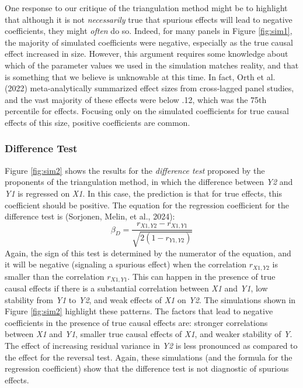 \documentclass[
  man,mask,floatsintext]{apa6}
\begin{document}
One response to our critique of the triangulation method might be to highlight that although it is not \emph{necessarily} true that spurious effects will lead to negative coefficients, they might \emph{often} do so. Indeed, for many panels in Figure \ref{fig:sim1}, the majority of simulated coefficients were negative, especially as the true causal effect increased in size. However, this argument requires some knowledge about which of the parameter values we used in the simulation matches reality, and that is something that we believe is unknowable at this time. In fact, Orth et al. (2022) meta-analytically summarized effect sizes from cross-lagged panel studies, and the vast majority of these effects were below .12, which was the 75th percentile for effects. Focusing only on the simulated coefficients for true causal effects of this size, positive coefficients are common.

\subsubsection{Difference Test}\label{difference-test}

Figure \ref{fig:sim2} shows the results for the \emph{difference test} proposed by the proponents of the triangulation method, in which the difference between \emph{Y2} and \emph{Y1} is regressed on \emph{X1}. In this case, the prediction is that for true effects, this coefficient should be positive. The equation for the regression coefficient for the difference test is (Sorjonen, Melin, et al., 2024): \[\beta_{D} = \frac{r_{X1,Y2} - r_{X1,Y1}} {\sqrt{2(1 - r_{Y1,Y2})}}\] Again, the sign of this test is determined by the numerator of the equation, and it will be negative (signaling a spurious effect) when the correlation \(r_{X1,Y2}\) is smaller than the correlation \(r_{X1,Y1}\). This can happen in the presence of true causal effects if there is a substantial correlation between \emph{X1} and \emph{Y1}, low stability from \emph{Y1} to \emph{Y2}, and weak effects of \emph{X1} on \emph{Y2}. The simulations shown in Figure \ref{fig:sim2} highlight these patterns. The factors that lead to negative coefficients in the presence of true causal effects are: stronger correlations between \emph{X1} and \emph{Y1}, smaller true causal effects of \emph{X1}, and weaker stability of \emph{Y}. The effect of increasing residual variance in \emph{Y2} is less pronounced as compared to the effect for the reversal test. Again, these simulations (and the formula for the regression coefficient) show that the difference test is not diagnostic of spurious effects.
\end{document}
